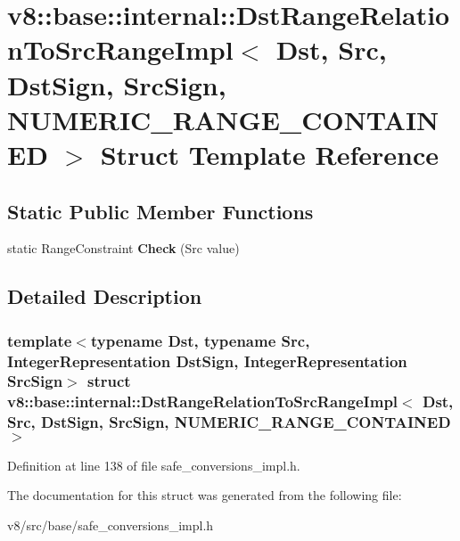 \hypertarget{structv8_1_1base_1_1internal_1_1DstRangeRelationToSrcRangeImpl_3_01Dst_00_01Src_00_01DstSign_00_8aac9712dc4583b15af9961fa6a03a85}{}\section{v8\+:\+:base\+:\+:internal\+:\+:Dst\+Range\+Relation\+To\+Src\+Range\+Impl$<$ Dst, Src, Dst\+Sign, Src\+Sign, N\+U\+M\+E\+R\+I\+C\+\_\+\+R\+A\+N\+G\+E\+\_\+\+C\+O\+N\+T\+A\+I\+N\+ED $>$ Struct Template Reference}
\label{structv8_1_1base_1_1internal_1_1DstRangeRelationToSrcRangeImpl_3_01Dst_00_01Src_00_01DstSign_00_8aac9712dc4583b15af9961fa6a03a85}
\subsection*{Static Public Member Functions}
\begin{DoxyCompactItemize}
\item 
\mbox{\label{structv8_1_1base_1_1internal_1_1DstRangeRelationToSrcRangeImpl_3_01Dst_00_01Src_00_01DstSign_00_8aac9712dc4583b15af9961fa6a03a85_adaea6904c3d62363a4593cf5bd90881d}} 
static Range\+Constraint {\bfseries Check} (Src value)
\end{DoxyCompactItemize}


\subsection{Detailed Description}
\subsubsection*{template$<$typename Dst, typename Src, Integer\+Representation Dst\+Sign, Integer\+Representation Src\+Sign$>$\newline
struct v8\+::base\+::internal\+::\+Dst\+Range\+Relation\+To\+Src\+Range\+Impl$<$ Dst, Src, Dst\+Sign, Src\+Sign, N\+U\+M\+E\+R\+I\+C\+\_\+\+R\+A\+N\+G\+E\+\_\+\+C\+O\+N\+T\+A\+I\+N\+E\+D $>$}



Definition at line 138 of file safe\+\_\+conversions\+\_\+impl.\+h.



The documentation for this struct was generated from the following file\+:\begin{DoxyCompactItemize}
\item 
v8/src/base/safe\+\_\+conversions\+\_\+impl.\+h\end{DoxyCompactItemize}
